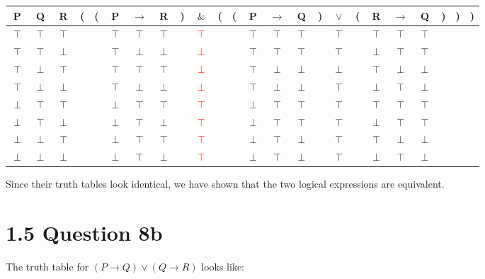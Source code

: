 \documentclass[12pt]{article}
\begin{document}
	\begin{tabular}{ c  c  c | c  c  c  c  c  c  c  c  c  c  c  c  c  c  c  c  c  c  c  c  c }
		P & Q & R & ( & ( & P & $\rightarrow$ & R & ) & $\&$ & ( & ( & P & $\rightarrow$ & Q & ) & $\lor$ & ( & R & $\rightarrow$ & Q & ) & ) & )\\
		\hline 
		$\top$ & $\top$ & $\top$ &  &  & $\top$ & $\top$ & $\top$ &  & \textcolor{red}{$\top$} &  &  & $\top$ & $\top$ & $\top$ &  & $\top$ &  & $\top$ & $\top$ & $\top$ &  &  & \\
		$\top$ & $\top$ & $\perp$ &  &  & $\top$ & $\perp$ & $\perp$ &  & \textcolor{red}{$\perp$} &  &  & $\top$ & $\top$ & $\top$ &  & $\top$ &  & $\perp$ & $\top$ & $\top$ &  &  & \\
		$\top$ & $\perp$ & $\top$ &  &  & $\top$ & $\top$ & $\top$ &  & \textcolor{red}{$\perp$} &  &  & $\top$ & $\perp$ & $\perp$ &  & $\perp$ &  & $\top$ & $\perp$ & $\perp$ &  &  & \\
		$\top$ & $\perp$ & $\perp$ &  &  & $\top$ & $\perp$ & $\perp$ &  & \textcolor{red}{$\perp$} &  &  & $\top$ & $\perp$ & $\perp$ &  & $\top$ &  & $\perp$ & $\top$ & $\perp$ &  &  & \\
		$\perp$ & $\top$ & $\top$ &  &  & $\perp$ & $\top$ & $\top$ &  & \textcolor{red}{$\top$} &  &  & $\perp$ & $\top$ & $\top$ &  & $\top$ &  & $\top$ & $\top$ & $\top$ &  &  & \\
		$\perp$ & $\top$ & $\perp$ &  &  & $\perp$ & $\top$ & $\perp$ &  & \textcolor{red}{$\top$} &  &  & $\perp$ & $\top$ & $\top$ &  & $\top$ &  & $\perp$ & $\top$ & $\top$ &  &  & \\
		$\perp$ & $\perp$ & $\top$ &  &  & $\perp$ & $\top$ & $\top$ &  & \textcolor{red}{$\top$} &  &  & $\perp$ & $\top$ & $\perp$ &  & $\top$ &  & $\top$ & $\perp$ & $\perp$ &  &  & \\
		$\perp$ & $\perp$ & $\perp$ &  &  & $\perp$ & $\top$ & $\perp$ &  & \textcolor{red}{$\top$} &  &  & $\perp$ & $\top$ & $\perp$ &  & $\top$ &  & $\perp$ & $\top$ & $\perp$ &  &  & \\
	\end{tabular}

	Since their truth tables look identical, we have shown that the two logical expressions are equivalent.
	
	\section{1.5 Question 8b}
	
	The truth table for $(P \rightarrow Q) \lor (Q \rightarrow R)$ looks like:
	
\end{document}
